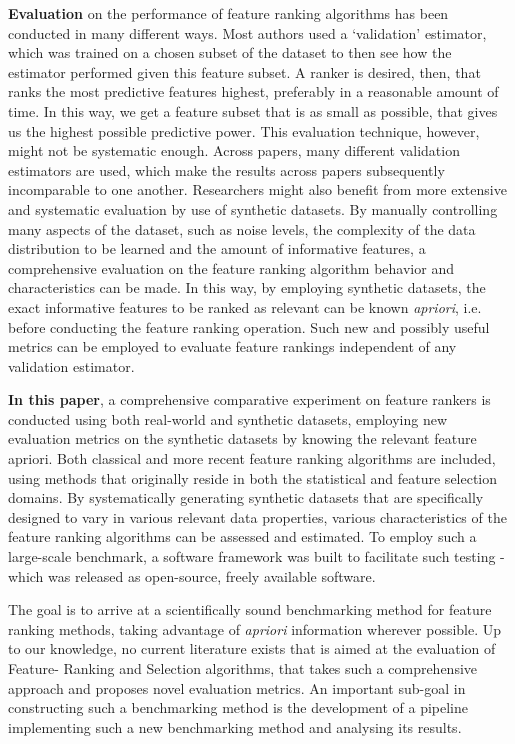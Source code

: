 \documentclass{article}
\begin{document}
\textbf{Evaluation} on the performance of feature ranking algorithms has been conducted in many different ways. Most authors used a `validation' estimator, which was trained on a chosen subset of the dataset to then see how the estimator performed given this feature subset. A ranker is desired, then, that ranks the most predictive features highest, preferably in a reasonable amount of time. In this way, we get a feature subset that is as small as possible, that gives us the highest possible predictive power. This evaluation technique, however, might not be systematic enough. Across papers, many different validation estimators are used, which make the results across papers subsequently incomparable to one another. Researchers might also benefit from more extensive and systematic evaluation by use of synthetic datasets. By manually controlling many aspects of the dataset, such as noise levels, the complexity of the data distribution to be learned and the amount of informative features, a comprehensive evaluation on the feature ranking algorithm behavior and characteristics can be made. In this way, by employing synthetic datasets, the exact informative features to be ranked as relevant can be known \textit{\gls{apriori}}, i.e. before conducting the feature ranking operation. Such new and possibly useful metrics can be employed to evaluate feature rankings independent of any validation estimator.

\textbf{In this paper}, a comprehensive comparative experiment on feature rankers is conducted using both real-world and synthetic datasets, employing new evaluation metrics on the synthetic datasets by knowing the relevant feature apriori. Both classical and more recent feature ranking algorithms are included, using methods that originally reside in both the statistical and feature selection domains. By systematically generating synthetic datasets that are specifically designed to vary in various relevant data properties, various characteristics of the feature ranking algorithms can be assessed and estimated. To employ such a large-scale benchmark, a software framework was built to facilitate such testing - which was released as open-source, freely available software.

The goal is to arrive at a scientifically sound benchmarking method for feature ranking methods, taking advantage of \textit{\gls{apriori}} information wherever possible. Up to our knowledge, no current literature exists that is aimed at the evaluation of Feature- Ranking and Selection algorithms, that takes such a comprehensive approach and proposes novel evaluation metrics. An important sub-goal in constructing such a benchmarking method is the development of a pipeline implementing such a new benchmarking method and analysing its results.
\end{document}
